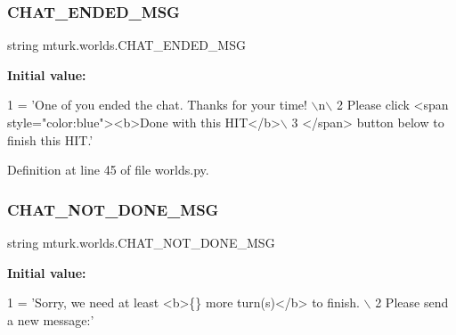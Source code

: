 \mbox{\label{namespacemturk_1_1worlds_a77c9582a4139c390382fea704a4d783a}} 
\subsubsection{\texorpdfstring{C\+H\+A\+T\+\_\+\+E\+N\+D\+E\+D\+\_\+\+M\+SG}{CHAT\_ENDED\_MSG}}
{\footnotesize\ttfamily string mturk.\+worlds.\+C\+H\+A\+T\+\_\+\+E\+N\+D\+E\+D\+\_\+\+M\+SG}

{\bfseries Initial value\+:}
\begin{DoxyCode}
1 =  \textcolor{stringliteral}{'One of you ended the chat. Thanks for your time! \(\backslash\)n\(\backslash\)}
2 \textcolor{stringliteral}{        Please click <span style="color:blue"><b>Done with this HIT</b>\(\backslash\)}
3 \textcolor{stringliteral}{        </span> button below to finish this HIT.'}
\end{DoxyCode}


Definition at line 45 of file worlds.\+py.

\mbox{\label{namespacemturk_1_1worlds_a93dac8fe3734ce10f8e25dad93e2f164}} 
\subsubsection{\texorpdfstring{C\+H\+A\+T\+\_\+\+N\+O\+T\+\_\+\+D\+O\+N\+E\+\_\+\+M\+SG}{CHAT\_NOT\_DONE\_MSG}}
{\footnotesize\ttfamily string mturk.\+worlds.\+C\+H\+A\+T\+\_\+\+N\+O\+T\+\_\+\+D\+O\+N\+E\+\_\+\+M\+SG}

{\bfseries Initial value\+:}
\begin{DoxyCode}
1 =  \textcolor{stringliteral}{'Sorry, we need at least <b>\{\} more turn(s)</b> to finish. \(\backslash\)}
2 \textcolor{stringliteral}{       Please send a new message:'}
\end{DoxyCode}


